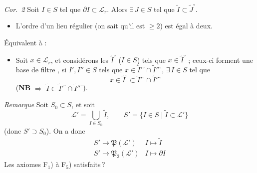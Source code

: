 \documentclass[11pt,a4paper]{article}
\begin{document}
\emph{Cor.~2} Soit $I \in S$ tel que $\partial I \subset \mathcal{L}_r$. Alors $\exists\, J \in S$ tel que $\widetilde{I} \subset \widetilde{J}^{\circ}$.

\begin{itemize}
  \item[F$_5$)] L'ordre d'un lieu régulier (on sait qu'il est $\geq 2$) est égal à deux.
\end{itemize}
Équivalent à :
\begin{itemize}
  \item[F$'_5$)] Soit $x \in \mathcal{L}_r$, et considérons les $\widetilde{I}^{\circ}$ ($I \in S$) tels que $x \in \widetilde{I}^{\circ}$ ; ceux-ci forment une base de filtre \ill{} \ill{}, si $I', I'' \in S$ tels que $x \in \widetilde{I}'^{\circ} \cap \widetilde{I}''^{\circ}$, $\exists\, I \in S$ tel que
  \[
    x \in \widetilde{I}^{\circ} \subset \widetilde{I}'^{\circ} \cap \widetilde{I}''^{\circ}
  \]
  (\textbf{NB} \struck{\ill{}} $\Longrightarrow$ $\widetilde{I} \subset \widetilde{I}'^{\circ} \cap \widetilde{I}''^{\circ}$).
\end{itemize}

\emph{Remarque} Soit $S_0 \subset S$, et soit
\[
  \mathcal{L}' = \bigcup_{I \in S_0} \widetilde{I}, \qquad S' = \lbrace I \in S \mid \widetilde{I} \subset \mathcal{L}' \rbrace
\]
(donc $S' \supset S_0$). On a donc
\[
  \begin{array}{ll}
    S' \to \mathfrak{P}(\mathcal{L}') & I \mapsto \widetilde{I} \\
    S' \to \mathfrak{P}_2(\mathcal{L}') & I \mapsto \partial I
  \end{array}
\]
Les axiomes F$_1$) à F$_5$)  satisfaits\,?
\end{document}
